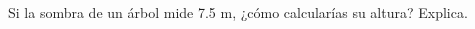 Si la sombra de un árbol mide 7.5 m, ¿cómo calcularías su altura? Explica.

\begin{solutionbox}{1cm}

\end{solutionbox}
